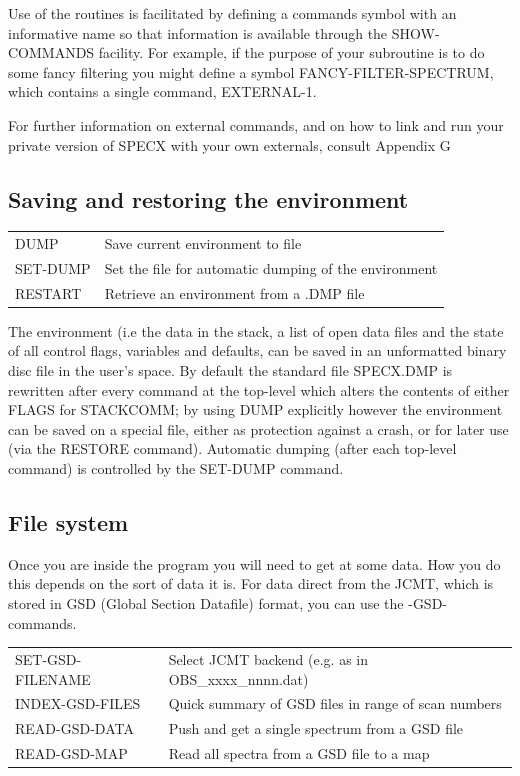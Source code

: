 \documentclass[11pt,twoside]{report}
\begin{document}
Use of the routines is facilitated by defining a commands symbol with an
informative name so that information is available through the SHOW-COMMANDS facility.
For example, if the purpose of your subroutine is to do some fancy filtering
you might define a symbol FANCY-FILTER-SPECTRUM, which contains a single
command, EXTERNAL-1.

For further information on external commands, and on how to link and run your
private version of SPECX with your own externals, consult Appendix G

\subsection{Saving and restoring the environment}

\begin{tabular}{ll}
DUMP                   & Save current environment to file\\
SET-DUMP               & Set the file for automatic dumping of the environment\\
RESTART                & Retrieve an environment from a .DMP file\\
\end{tabular}

The environment (i.e the data in the stack, a list of open
data files and the state of all control flags, variables and defaults,
can
be saved in an unformatted binary disc file in the user's space. By default the
standard file SPECX.DMP is rewritten after every command at
the top-level which alters the contents of either FLAGS for
STACKCOMM; by using DUMP explicitly however the environment
can be saved on a special file, either as protection against a crash, or for
later use (via the RESTORE command). Automatic dumping (after each top-level
command) is controlled by the SET-DUMP command.

\subsection{File system}

Once you are inside the program you will need to get at some data. How you
do this depends on the sort of data it is. For data direct from the JCMT,
which is stored in GSD (Global Section Datafile) format, you can use the
-GSD- commands.

\begin{tabular}{ll}
SET-GSD-FILENAME       & Select JCMT backend (e.g. as in OBS\_xxxx\_nnnn.dat)\\
INDEX-GSD-FILES        & Quick summary of GSD files in range of scan numbers\\
READ-GSD-DATA          & Push and get a single spectrum from a GSD file\\
READ-GSD-MAP           & Read all spectra from a GSD file to a map\\
\end{tabular}
\end{document}
